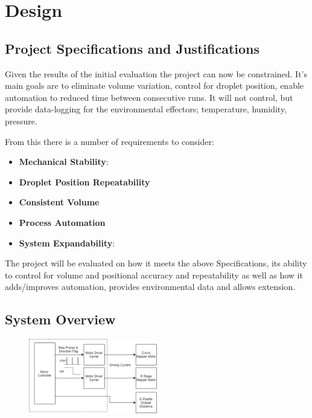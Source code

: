 \chapter{Design}\label{C:des}

\section{Project Specifications and Justifications}
Given the results of the initial evaluation the project can now be constrained. It's main goals are to eliminate volume variation, control for droplet position, enable automation to reduced time between consecutive runs. It will not control, but provide data-logging for the environmental effectors; temperature, humidity, pressure.

From this there is a number of requirements to consider:

\begin{itemize}
    \item \textbf{Mechanical Stability}:
    \item \textbf{Droplet Position Repeatability}
    \item \textbf{Consistent Volume}
    \item \textbf{Process Automation}
    \item \textbf{System Expandability}:
\end{itemize}

The project will be evaluated on how it meets the above Specifications, its ability to control for volume and positional accuracy and repeatability as well as how it adds/improves automation, provides environmental data and allows extension.

\section{System Overview}

\begin{figure}[h]
    \begin{center}
        \includegraphics[width=0.5\textwidth]{img/ED_block_diag.png}
    \end{center}
\end{figure}

